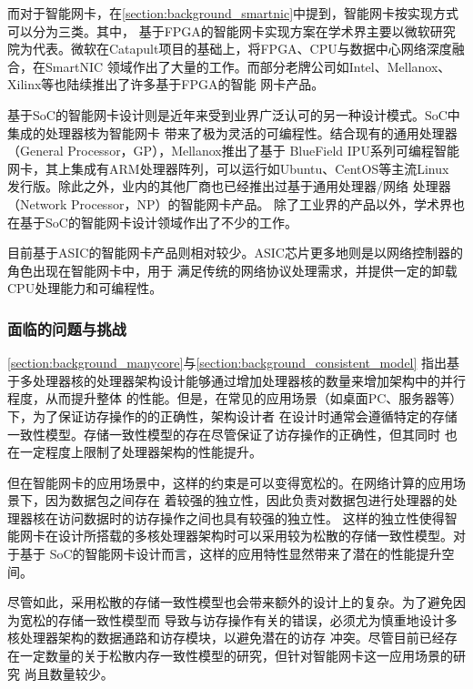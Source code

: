而对于智能网卡，在\autoref{section:background_smartnic}中提到，智能网卡按实现方式可以分为三类。其中，
基于FPGA的智能网卡实现方案在学术界主要以微软研究院为代表\cite{firestone2018azure,fowers2015scalable,
caulfield2016cloud}。微软在Catapult项目的基础上，将FPGA、CPU与数据中心网络深度融合，在SmartNIC
领域作出了大量的工作。而部分老牌公司如Intel、Mellanox、Xilinx等也陆续推出了许多基于FPGA的智能
网卡产品\cite{mellanox2020whitepaper,intel2020pac,intel2019d5005,xilinx2020alveou25,
xilinx2020x2}。

基于SoC的智能网卡设计则是近年来受到业界广泛认可的另一种设计模式。SoC中集成的处理器核为智能网卡
带来了极为灵活的可编程性。结合现有的通用处理器（General Processor，GP），Mellanox推出了基于
BlueField IPU系列可编程智能网卡，其上集成有ARM处理器阵列，可以运行如Ubuntu、CentOS等主流Linux
发行版\cite{mellanox2020bluefield}。除此之外，业内的其他厂商也已经推出过基于通用处理器/网络
处理器（Network Processor，NP）的智能网卡产品\cite{broadcom2020stingray,annapurna2020announce}。
除了工业界的产品以外，学术界也在基于SoC的智能网卡设计领域作出了不少的工作\cite{di2020pspin}。

目前基于ASIC的智能网卡产品则相对较少。ASIC芯片更多地则是以网络控制器的角色出现在智能网卡中，用于
满足传统的网络协议处理需求，并提供一定的卸载CPU处理能力和可编程性\cite{maxiaoxiao2022survey}。

\subsubsection{面临的问题与挑战}
\label{section:problems_and_challenges}

\autoref{section:background_manycore}与\autoref{section:background_consistent_model}
指出基于多处理器核的处理器架构设计能够通过增加处理器核的数量来增加架构中的并行程度，从而提升整体
的性能。但是，在常见的应用场景（如桌面PC、服务器等）下，为了保证访存操作的的正确性，架构设计者
在设计时通常会遵循特定的存储一致性模型。存储一致性模型的存在尽管保证了访存操作的正确性，但其同时
也在一定程度上限制了处理器架构的性能提升。

但在智能网卡的应用场景中，这样的约束是可以变得宽松的。在网络计算的应用场景下，因为数据包之间存在
着较强的独立性，因此负责对数据包进行处理器的处理器核在访问数据时的访存操作之间也具有较强的独立性。
这样的独立性使得智能网卡在设计所搭载的多核处理器架构时可以采用较为松散的存储一致性模型。对于基于
SoC的智能网卡设计而言，这样的应用特性显然带来了潜在的性能提升空间。

尽管如此，采用松散的存储一致性模型也会带来额外的设计上的复杂。为了避免因为宽松的存储一致性模型而
导致与访存操作有关的错误，必须尤为慎重地设计多核处理器架构的数据通路和访存模块，以避免潜在的访存
冲突。尽管目前已经存在一定数量的关于松散内存一致性模型的研究，但针对智能网卡这一应用场景的研究
尚且数量较少。

